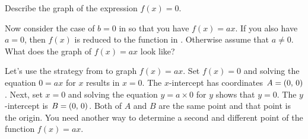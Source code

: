 \documentclass[a4paper,oneside,12pt]{article}
\begin{document}

\begin{exercise}
\label{ex:constant_function_zero}
Describe the graph of the expression $f(x) = 0$.
\end{exercise}


Now consider the case of $b = 0$ in
 so that you have
$f(x) = ax$.  If you also have $a = 0$, then $f(x)$ is reduced to the
function in .  Otherwise assume
that $a \neq 0$.  What does the graph of $f(x) = ax$ look like?

Let's use the strategy from  to graph
$f(x) = ax$.  Set $f(x) = 0$ and solving the equation $0 = ax$ for $x$
results in $x = 0$.  The $x$-intercept has coordinates
$A = \left\lparen{0},\, {0}\right\rparen$.  Next, set $x = 0$ and solving the equation
$y = a \times 0$ for $y$ shows that $y = 0$.  The $y$-intercept is
$B = \left\lparen{0},\, {0}\right\rparen$.  Both of $A$ and $B$ are the same point and that
point is the origin.  You need another way to determine a second and
different point of the function $f(x) = ax$.
\end{document}
